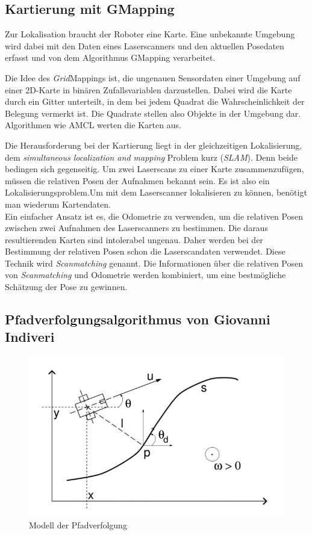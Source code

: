 \documentclass[11pt,a4paper]{article}
\begin{document}
\subsection{Kartierung mit GMapping  \cite{Gmapping}} \label{ssection:gmapping}
{
	Zur Lokalisation braucht der Roboter eine Karte. Eine unbekannte Umgebung wird dabei mit den Daten eines Laserscanners und den aktuellen Posedaten erfasst und von dem Algorithmus GMapping verarbeitet.
	
	Die Idee des  \textit{Grid}Mappings ist, die ungenauen Sensordaten einer Umgebung auf einer 2D-Karte in bin\"aren Zufallsvariablen darzustellen. Dabei wird die Karte durch ein Gitter unterteilt, in dem bei jedem Quadrat die Wahrscheinlichkeit der Belegung vermerkt ist. Die Quadrate stellen also Objekte in der Umgebung dar. Algorithmen wie AMCL werten die Karten aus.  
	
	Die Herausforderung bei der Kartierung liegt in der gleichzeitigen Lokalisierung, dem \textit{simultaneous localization and mapping} Problem kurz (\textit{SLAM}). Denn beide bedingen sich gegenseitig. Um  zwei Laserscans zu einer Karte zusammenzuf\"ugen, m\"ussen die relativen Posen der Aufnahmen bekannt sein. Es ist also ein Lokalisierungsproblem.Um mit dem Laserscanner lokalisieren zu k\"onnen, ben\"otigt man wiederum Kartendaten. \\
    
    Ein einfacher Ansatz ist es, die Odometrie zu verwenden, um die relativen Posen zwischen zwei Aufnahmen des Laserscanners zu bestimmen. Die daraus resultierenden Karten sind intolerabel ungenau. Daher werden bei der Bestimmung der relativen Posen schon die Laserscandaten verwendet. Diese Technik wird \textit{Scanmatching} genannt. Die Informationen \"uber die relativen Posen von \textit{Scanmatching} und Odometrie werden kombiniert, um eine bestm\"ogliche Sch\"atzung der Pose zu gewinnen.

\subsection{Pfadverfolgungsalgorithmus von Giovanni Indiveri}


\begin{figure}[h]
	\includegraphics[width=\linewidth]{pictures/Pfadverfolgung.JPG}
	\caption{Modell der Pfadverfolgung}
\end{figure}

}
\end{document}
